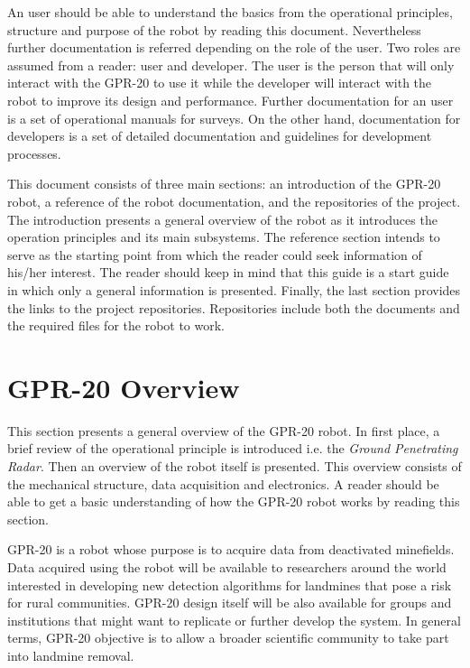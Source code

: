\documentclass{article}
\begin{document}
An user should be able to understand the basics from the operational principles, structure and purpose of the robot by reading this document. Nevertheless further documentation is referred depending on the role of the user. Two roles are assumed from a reader: user and developer. The user is the person that will only interact with the GPR-20 to use it while the developer will interact with the robot to improve its design and performance. Further documentation for an user is a set of operational manuals for surveys. On the other hand, documentation for developers is a set of detailed documentation and guidelines for development processes.

This document consists of three main sections: an introduction of the GPR-20 robot, a reference of the robot documentation, and the repositories of the project. The introduction presents a general overview of the robot as it introduces the operation principles and its main subsystems. The reference section intends to serve as the starting point from which the reader could seek information of his/her interest. The reader should keep in mind that this guide is a start guide in which only a general information is presented. Finally, the last section provides the links to the project repositories. Repositories include both the documents and the required files for the robot to work.


\newpage
\section{GPR-20 Overview}
This section presents a general overview of the GPR-20 robot. In first place, a brief review of the operational principle is introduced i.e. the \textit{Ground Penetrating Radar}. Then an overview of the robot itself is presented. This overview consists of the mechanical structure, data acquisition and electronics. A reader should be able to get a basic understanding of how the GPR-20 robot works by reading this section.

GPR-20 is a robot whose purpose is to acquire data from deactivated minefields. Data acquired using the robot will be available to researchers around the world interested in developing new detection algorithms for landmines that pose a risk for rural communities. GPR-20 design itself will be also available for groups and institutions that might want to replicate or further develop the system. In general terms, GPR-20 objective is to allow a broader scientific community to take part into landmine removal. 
\end{document}
